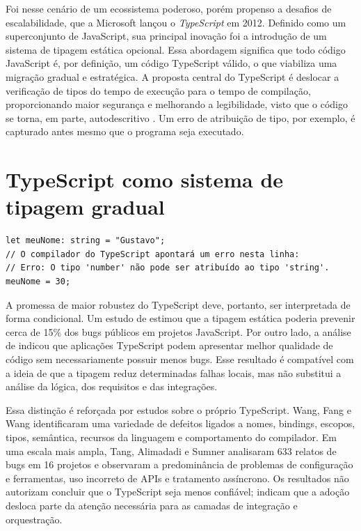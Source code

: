 Foi nesse cenário de um ecossistema poderoso, porém propenso a desafios de escalabilidade, que a Microsoft lançou o \textit{TypeScript} em 2012. Definido como um superconjunto de JavaScript, sua principal inovação foi a introdução de um sistema de tipagem estática opcional. Essa abordagem significa que todo código JavaScript é, por definição, um código TypeScript válido, o que viabiliza uma migração gradual e estratégica. A proposta central do TypeScript é deslocar a verificação de tipos do tempo de execução para o tempo de compilação, proporcionando maior segurança e melhorando a legibilidade, visto que o código se torna, em parte, autodescritivo \cite{george2020, makimov2022}. Um erro de atribuição de tipo, por exemplo, é capturado antes mesmo que o programa seja executado.

\section{TypeScript como sistema de tipagem gradual}

\begin{verbatim}
let meuNome: string = "Gustavo";
// O compilador do TypeScript apontará um erro nesta linha:
// Erro: O tipo 'number' não pode ser atribuído ao tipo 'string'.
meuNome = 30; 
\end{verbatim}

A promessa de maior robustez do TypeScript deve, portanto, ser interpretada de forma condicional. Um estudo de \cite{richards2017} estimou que a tipagem estática poderia prevenir cerca de 15\% dos bugs públicos em projetos JavaScript. Por outro lado, a análise de \cite{bogner2022} indicou que aplicações TypeScript podem apresentar melhor qualidade de código sem necessariamente possuir menos bugs. Esse resultado é compatível com a ideia de que a tipagem reduz determinadas falhas locais, mas não substitui a análise da lógica, dos requisitos e das integrações.

Essa distinção é reforçada por estudos sobre o próprio TypeScript. Wang, Fang e Wang \cite{wang2025bugs} identificaram uma variedade de defeitos ligados a nomes, bindings, escopos, tipos, semântica, recursos da linguagem e comportamento do compilador. Em uma escala mais ampla, Tang, Alimadadi e Sumner \cite{tang2026ecosystem} analisaram 633 relatos de bugs em 16 projetos e observaram a predominância de problemas de configuração e ferramentas, uso incorreto de APIs e tratamento assíncrono. Os resultados não autorizam concluir que o TypeScript seja menos confiável; indicam que a adoção desloca parte da atenção necessária para as camadas de integração e orquestração.

